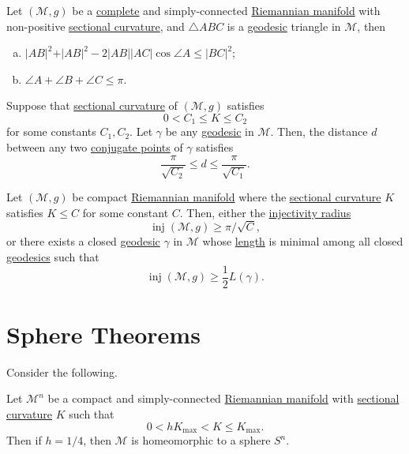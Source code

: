 \begin{corollary}
	Let \((\mathcal{M} , g )\) be a \hyperref[def:geodesically-complete]{complete} and simply-connected \hyperref[def:Riemannian-manifold]{Riemannian manifold} with non-positive \hyperref[def:sectional-curvature]{sectional curvature}, and \(\triangle ABC\) is a \hyperref[def:geodesic]{geodesic} triangle in \(\mathcal{M} \), then
	\begin{enumerate}[(a)]
		\item \(\vert AB \vert ^2 + \vert AB \vert ^2 - 2 \vert AB \vert \vert AC \vert \cos \angle A \leq \vert BC \vert ^2\);
		\item \(\angle A + \angle B + \angle C \leq \pi \).
	\end{enumerate}
\end{corollary}

\begin{corollary}
	Suppose that \hyperref[def:sectional-curvature]{sectional curvature} of \((\mathcal{M} , g)\) satisfies
	\[
		0 < C_1 \leq K \leq C_2
	\]
	for some constants \(C_1, C_2\). Let \(\gamma \) be any \hyperref[def:geodesic]{geodesic} in \(\mathcal{M} \). Then, the distance \(d\) between any two \hyperref[def:conjugate-point]{conjugate points} of \(\gamma \) satisfies
	\[
		\frac{\pi}{\sqrt{C_2} } \leq d \leq \frac{\pi }{\sqrt{C_1} }.
	\]
\end{corollary}

\begin{corollary}
	Let \((\mathcal{M} , g)\) be compact \hyperref[def:Riemannian-manifold]{Riemannian manifold} where the \hyperref[def:sectional-curvature]{sectional curvature} \(K\) satisfies \(K \leq C\) for some constant \(C\). Then, either the \hyperref[def:injectivity-radius]{injectivity radius}
	\[
		\mathop{\mathrm{inj}}(\mathcal{M} , g) \geq \pi / \sqrt{C},
	\]
	or there exists a closed \hyperref[def:geodesic]{geodesic} \(\gamma \) in \(\mathcal{M} \) whose \hyperref[def:length]{length} is  minimal among all closed \hyperref[def:geodesic]{geodesics} such that
	\[
		\mathop{\mathrm{inj}}(\mathcal{M} , g) \geq \frac{1}{2} L(\gamma ).
	\]
\end{corollary}

\section{Sphere Theorems}
Consider the following.

\begin{theorem}\label{thm:sphere}
	Let \(\mathcal{M} ^n\) be a compact and simply-connected \hyperref[def:Riemannian-manifold]{Riemannian manifold} with \hyperref[def:sectional-curvature]{sectional curvature} \(K\) such that
	\[
		0 < h K_{\max } < K \leq K_{\max } .
	\]
	Then if \(h = 1 / 4\), then \(\mathcal{M} \) is homeomorphic to a sphere \(S^n\).
\end{theorem}

